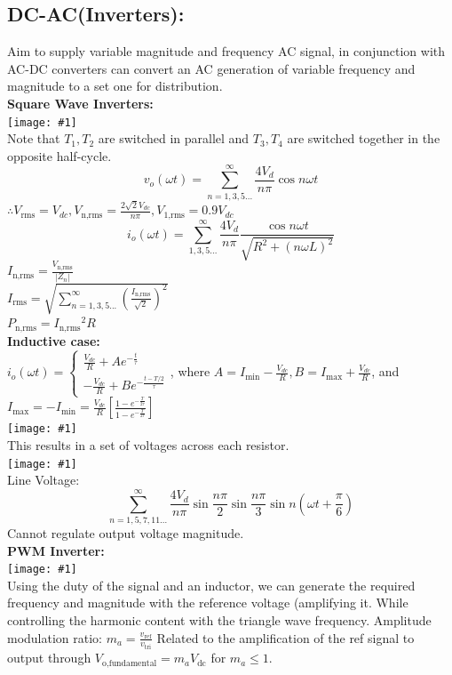 \documentclass[10pt,landscape,a4paper]{article}
\newcommand{\subs}[1]{\ensuremath{_{\text{#1}}}}
\newcommand{\rms}{\subs{rms}}
\newcommand{\nrms}[1]{\subs{#1,rms}}
\newcommand{\inlineimage}[1]{\texttt{[image: \#1]}\\}
\newcommand{\dc}{\subs{{dc}}}
\begin{document}
\begin{multicols*}{4}
		\section*{DC-AC(Inverters):}
		Aim to supply variable magnitude and frequency AC signal, in conjunction with AC-DC converters can convert an AC generation of variable frequency and magnitude to a set one for distribution.\\
		\textbf{Square Wave Inverters:}\\
		\inlineimage{squarewaveinv.png}
		Note that $ T_1,T_2 $ are switched in parallel and $ T_3,T_4 $ are switched together in the opposite half-cycle.\\
		\[ v_o(\omega t) = \sum_{n=1,3,5...}^{\infty} \frac{4V_d}{n\pi}\cos n\omega t \]
		$ \therefore V\rms = V_{dc} , V\nrms{n} = \frac{2\sqrt{2}V_{dc}}{n\pi} , V\nrms{1}=0.9V_{dc} $\\
		\[ i_o(\omega t) = \sum_{1,3,5...}^{\infty}\frac{4V_d}{n\pi}\frac{\cos n\omega t}{\sqrt{R^2+(n\omega L)^2}} \]
		$I\nrms{n}=\frac{V\nrms{n}}{|Z_n|} $\\
		$ I\rms = \sqrt{\sum_{n=1,3,5...}^{\infty}\left(\frac{I\nrms{n}}{\sqrt{2}}\right)^2} $\\
		$ P\nrms{n} = I\nrms{n}^2R $\\ 
		\textbf{Inductive case:}\\
		$ i_o(\omega t) = \left\{ \begin{array}{cr}
			\frac{V_{dc}}{R}+Ae^{-\frac{t}{\tau}}\\
			-\frac{V_{dc}}{R}+Be^{-\frac{t-T/2}{\tau}}
		\end{array} \right. $, where $ A = I\subs{min}-\frac{V_{dc}}{R}, B = I\subs{max} + \frac{V_{dc}}{R} $, and $ I\subs{max} = -I\subs{min} = \frac{V_{dc}}{R}\left[\frac{1-e^{-\frac{T}{2\tau}}}{1-e^{-\frac{T}{2\tau}}}\right] $\\
		\inlineimage{inverter3phase.png}
		This results in a set of voltages across each resistor.\\
		\inlineimage{inverter3phaseOP.png}
		Line Voltage: \[ \sum^\infty_{n = 1,5,7,11\ldots} \frac{4V_d}{n\pi}\sin\frac{n\pi}{2} \sin\frac{n\pi}{3}\sin n(\omega t+\frac{\pi}{6}) \] 
		Cannot regulate output voltage magnitude.\\
		\textbf{PWM Inverter:}\\
		\inlineimage{PWMcontrol.png}
		Using the duty of the signal and an inductor, we can generate the required frequency and magnitude with the reference voltage (amplifying it. While controlling the harmonic content with the triangle wave frequency. Amplitude modulation ratio: $ m_a = \frac{v\subs{ref}}{v\subs{tri}} $ Related to the amplification of the ref signal to output through $ V\subs{o,fundamental} = m_aV\dc $ for $ m_a\leqslant 1 $.\\

\end{multicols*}
\end{document}
